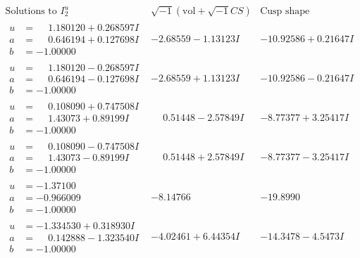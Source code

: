 \documentclass[1p]{elsarticle_modified}
\theoremstyle{definition}
\newcommand{\I}{\sqrt{-1}}
\begin{document}
$$\begin{array}{c|c|c}  
\text{Solutions to }I^u_{2}& \I (\text{vol} + \sqrt{-1}CS) & \text{Cusp shape}\\
 \hline 
\begin{aligned}
u &= \phantom{-}1.180120 + 0.268597 I \\
a &= \phantom{-}0.646194 + 0.127698 I \\
b &= -1.00000\phantom{ +0.000000I}\end{aligned}
 & -2.68559 - 1.13123 I & -10.92586 + 0.21647 I \\ \hline\begin{aligned}
u &= \phantom{-}1.180120 - 0.268597 I \\
a &= \phantom{-}0.646194 - 0.127698 I \\
b &= -1.00000\phantom{ +0.000000I}\end{aligned}
 & -2.68559 + 1.13123 I & -10.92586 - 0.21647 I \\ \hline\begin{aligned}
u &= \phantom{-}0.108090 + 0.747508 I \\
a &= \phantom{-}1.43073 + 0.89199 I \\
b &= -1.00000\phantom{ +0.000000I}\end{aligned}
 & \phantom{-}0.51448 - 2.57849 I & -8.77377 + 3.25417 I \\ \hline\begin{aligned}
u &= \phantom{-}0.108090 - 0.747508 I \\
a &= \phantom{-}1.43073 - 0.89199 I \\
b &= -1.00000\phantom{ +0.000000I}\end{aligned}
 & \phantom{-}0.51448 + 2.57849 I & -8.77377 - 3.25417 I \\ \hline\begin{aligned}
u &= -1.37100\phantom{ +0.000000I} \\
a &= -0.966009\phantom{ +0.000000I} \\
b &= -1.00000\phantom{ +0.000000I}\end{aligned}
 & -8.14766\phantom{ +0.000000I} & -19.8990\phantom{ +0.000000I} \\ \hline\begin{aligned}
u &= -1.334530 + 0.318930 I \\
a &= \phantom{-}0.142888 - 1.323540 I \\
b &= -1.00000\phantom{ +0.000000I}\end{aligned}
 & -4.02461 + 6.44354 I & -14.3478 - 4.5473 I \\ \hline\begin{aligned}

\end{aligned}
\end{array}$$
\end{document}
